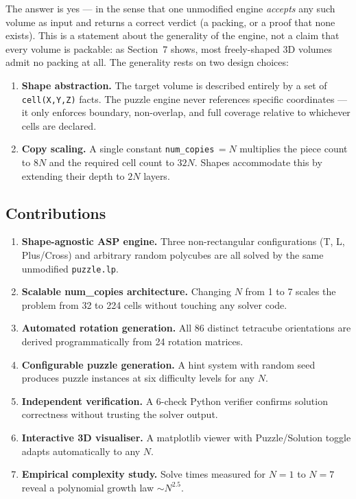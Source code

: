 \documentclass[12pt,a4paper]{article}
\begin{document}
The answer is yes --- in the sense that one unmodified engine \emph{accepts}
any such volume as input and returns a correct verdict (a packing, or a proof
that none exists).  This is a statement about the generality of the engine, not
a claim that every volume is packable: as Section~7 shows, most freely-shaped
3D volumes admit no packing at all.  The generality rests on two design choices:
\begin{enumerate}[leftmargin=1.8em]
  \item \textbf{Shape abstraction.}  The target volume is described entirely
        by a set of \texttt{cell(X,Y,Z)} facts.  The puzzle engine never
        references specific coordinates --- it only enforces boundary, non-overlap,
        and full coverage relative to whichever cells are declared.
  \item \textbf{Copy scaling.}  A single constant \texttt{num\_copies}\,$=N$
        multiplies the piece count to $8N$ and the required cell count to $32N$.
        Shapes accommodate this by extending their depth to $2N$ layers.
\end{enumerate}

\subsection{Contributions}

\begin{contribbox}
\begin{enumerate}[leftmargin=1.5em, label=\textbf{C\arabic*.}]
  \item \textbf{Shape-agnostic ASP engine.}  Three non-rectangular
        configurations (T, L, Plus/Cross) and arbitrary random polycubes
        are all solved by the same unmodified \texttt{puzzle.lp}.
  \item \textbf{Scalable num\_copies architecture.}  Changing $N$ from 1 to 7
        scales the problem from 32 to 224 cells without touching any solver code.
  \item \textbf{Automated rotation generation.}  All 86 distinct tetracube
        orientations are derived programmatically from 24 rotation matrices.
  \item \textbf{Configurable puzzle generation.}  A hint system with random
        seed produces puzzle instances at six difficulty levels for any $N$.
  \item \textbf{Independent verification.}  A 6-check Python verifier
        confirms solution correctness without trusting the solver output.
  \item \textbf{Interactive 3D visualiser.}  A matplotlib viewer with
        Puzzle/Solution toggle adapts automatically to any $N$.
  \item \textbf{Empirical complexity study.}  Solve times measured for
        $N=1$ to $N=7$ reveal a polynomial growth law $\sim N^{2.5}$.
\end{enumerate}
\end{contribbox}
\end{document}
